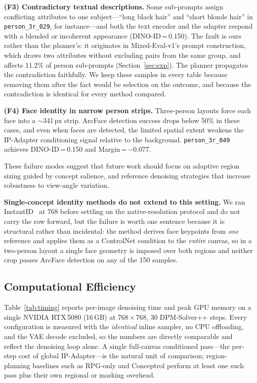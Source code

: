 \documentclass[10pt,twocolumn,letterpaper]{article}
\begin{document}
\noindent\textbf{(F3) Contradictory textual descriptions.}
Some sub-prompts assign conflicting attributes to one subject---``long black
hair'' and ``short blonde hair'' in \texttt{person\_3r\_029}, for
instance---and both the text encoder and the adapter respond with a blended
or incoherent appearance (DINO-ID\,=\,0.150).  The fault is ours rather than
the planner's: it originates in Mixed-Eval-v1's prompt construction, which
draws two attributes without excluding pairs from the same group, and affects
$11.2\%$ of person sub-prompts (Section~\ref{sec:exp}).  The planner
propagates the contradiction faithfully.  We keep these samples in every
table because removing them after the fact would be selection on the outcome,
and because the contradiction is identical for every method compared.

\noindent\textbf{(F4) Face identity in narrow person strips.}
Three-person layouts force each face into a $\sim$341\,px strip.
ArcFace detection success drops below 50\% in these cases, and even
when faces are detected, the limited spatial extent weakens the
IP-Adapter conditioning signal relative to the background.
\texttt{person\_3r\_049} achieves DINO-ID\,=\,0.150 and
Margin\,=\,$-$0.077.

These failure modes suggest that future work should focus on
adaptive region sizing guided by concept salience, and reference
denoising strategies that increase robustness to view-angle variation.

\noindent\textbf{Single-concept identity methods do not extend to this
setting.}
We ran InstantID~\cite{wang2024instantid} at $768$ before settling on the
native-resolution protocol and do not carry the row forward, but the failure
is worth one sentence because it is structural rather than incidental: the
method derives face keypoints from \emph{one} reference and applies them as a
ControlNet condition to the \emph{entire} canvas, so in a two-person layout a
single face geometry is imposed over both regions and neither crop passes
ArcFace detection on any of the 150 samples.


\subsection{Computational Efficiency}
\label{sec:efficiency}

Table~\ref{tab:timing} reports per-image denoising time and peak GPU
memory on a single NVIDIA RTX\,5080 (16\,GB) at $768\!\times\!768$, 30
DPM-Solver++ steps.  Every configuration is measured with the
\emph{identical} inline sampler, no CPU offloading, and the VAE decode
excluded, so the numbers are directly comparable and reflect the
denoising loop alone.  A single full-canvas conditioned pass---the
per-step cost of global IP-Adapter---is the natural unit of comparison;
region-planning baselines such as RPG-only and Conceptrol perform at
least one such pass plus their own regional or masking overhead.
\end{document}
